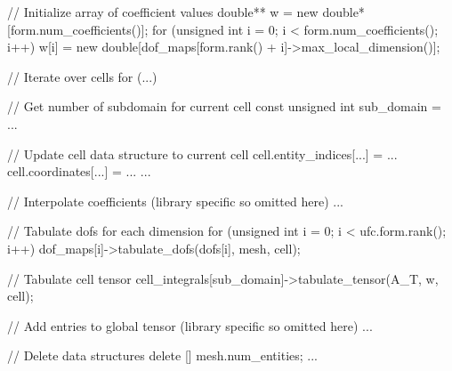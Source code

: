 \begin{c++}
{  // Initialize array of coefficient values
  double** w = new double*[form.num_coefficients()];
  for (unsigned int i = 0; i < form.num_coefficients(); i++)
    w[i] = new double[dof_maps[form.rank() + i]->max_local_dimension()];

  // Iterate over cells
  for (...)
  {
    // Get number of subdomain for current cell
    const unsigned int sub_domain = ...

    // Update cell data structure to current cell
    cell.entity_indices[...] = ...
    cell.coordinates[...] = ...
    ...

    // Interpolate coefficients (library specific so omitted here)
    ...

    // Tabulate dofs for each dimension
    for (unsigned int i = 0; i < ufc.form.rank(); i++)
      dof_maps[i]->tabulate_dofs(dofs[i], mesh, cell);

    // Tabulate cell tensor
    cell_integrals[sub_domain]->tabulate_tensor(A_T, w, cell);

    // Add entries to global tensor (library specific so omitted here)
    ...
  }

  // Delete data structures
  delete [] mesh.num_entities;
  ...
}
\end{c++}
